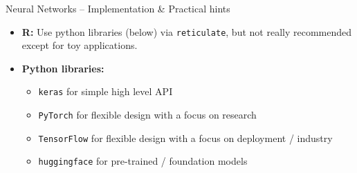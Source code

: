 \begin{frame}{Neural Networks -- Implementation \& Practical hints}
% 
% 
% 
% 
% 

\medskip
 

\begin{itemize}
  \item \textbf{R:} Use python libraries (below) via \texttt{reticulate}, but not really recommended except for toy applications.
  \item \textbf{Python libraries:} 
  \begin{itemize}
      \item \texttt{keras} for simple high level API 
      \item \texttt{PyTorch} for flexible design with a focus on research
      \item \texttt{TensorFlow} for flexible design with a focus on deployment / industry
      \item \texttt{huggingface} for pre-trained / foundation models
  \end{itemize}
\end{itemize}

\end{frame}



